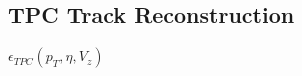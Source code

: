\subsection{TPC Track Reconstruction}\label{section:star_TPCeffi}
$\epsilon_{TPC}\left(p_T,\eta,V_{z}\right)$